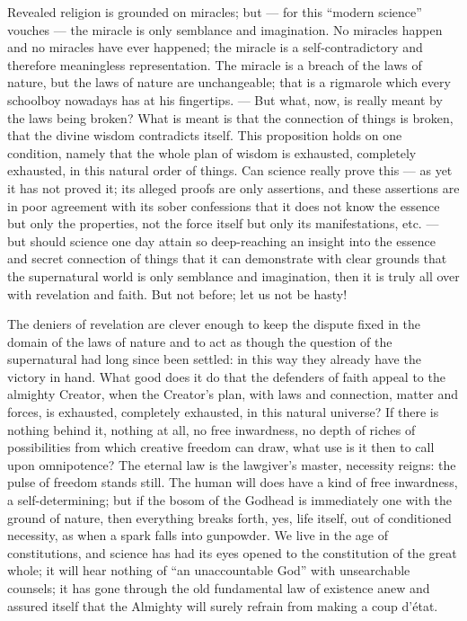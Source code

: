 \documentclass[12pt,a4paper,openany]{book}
\newcommand{\opage}[1]{\marginnote{\footnotesize\textit{[#1]}}}
\begin{document}
Revealed religion is grounded on miracles; but --- for this ``modern science'' vouches --- the miracle is only semblance and imagination. No miracles happen and no miracles have ever happened; the miracle is a self-contradictory and therefore meaningless representation. The miracle is a breach of the laws of nature, but the laws of nature are unchangeable; that is a rigmarole which every schoolboy nowadays has at his fingertips. --- But what, now, is really meant by the laws being broken? What is meant is that the connection of things is broken, that the divine wisdom contradicts itself. This proposition holds on one condition, namely that
\setcounter{footnote}{0}%
\opage{31}the whole plan of wisdom is exhausted, completely exhausted, in this natural order of things. Can science really prove this --- as yet it has not proved it; its alleged proofs are only assertions, and these assertions are in poor agreement with its sober confessions that it does not know the essence but only the properties, not the force itself but only its manifestations, etc. --- but should science one day attain so deep-reaching an insight into the essence and secret connection of things that it can demonstrate with clear grounds that the supernatural world is only semblance and imagination, then it is truly all over with revelation and faith. But not before; let us not be hasty!

The deniers of revelation are clever enough to keep the dispute fixed in the domain of the laws of nature and to act as though the question of the supernatural had long since been settled: in this way they already have the victory in hand. What good does it do that the defenders of faith appeal to the almighty Creator, when the Creator's plan, with laws and connection, matter and forces, is exhausted, completely exhausted, in this natural universe? If there is nothing behind it, nothing at all, no free inwardness, no depth of riches of possibilities from which creative freedom can draw, what use is it then to call upon omnipotence? The eternal law is the lawgiver's master, necessity reigns: the pulse of freedom stands still. The human will does have a kind of free inwardness, a self-determining; but if the bosom of the Godhead is immediately one with the ground of nature, then everything breaks forth, yes, life itself, out of conditioned necessity, as when a spark falls into gunpowder. We live in the age of
\setcounter{footnote}{0}%
\opage{32}constitutions, and science has had its eyes opened to the constitution of the great whole; it will hear nothing of ``an unaccountable God'' with unsearchable counsels; it has gone through the old fundamental law of existence anew and assured itself that the Almighty will surely refrain from making a coup d'état.
\end{document}
